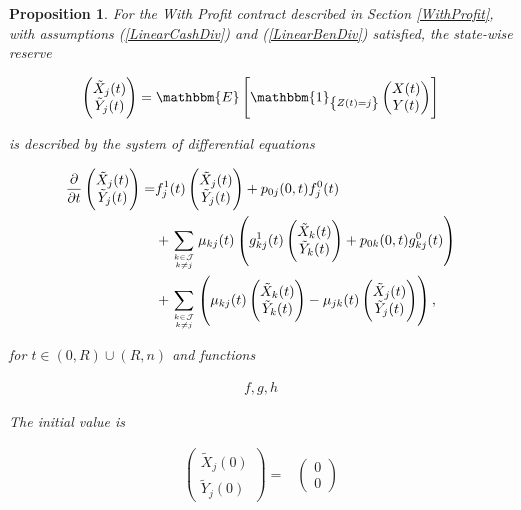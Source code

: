 \documentclass{article}
\newcommand{\1}[1]{\mathbbm{1}_{\left\lbrace #1 \right\rbrace}}
\newcommand{\expec}[1][def]{\mathbbm{E} \left[ #1 \right]}
\theoremstyle{break}
\newtheorem{proposition}[definition]{Proposition}%
\theoremstyle{remark}
\numberwithin{equation}{section}
\begin{document}
\begin{proposition} \label{WPMainResult}
For the With Profit contract described in Section \ref{WithProfit}, with assumptions (\ref{LinearCashDiv}) and (\ref{LinearBenDiv}) satisfied, the state-wise reserve

\begin{align*}
\begin{pmatrix}\tilde{X}_j(t) \\ \tilde{Y}_j(t)\end{pmatrix} = \expec[\1{Z(t)=j}\begin{pmatrix}X(t) \\ Y(t)\end{pmatrix}]
\end{align*}

is described by the system of differential equations

\begin{align*}
\frac{\partial}{\partial t} \begin{pmatrix}\tilde{X}_j(t) \\ \tilde{Y}_j(t)\end{pmatrix} =& f_j^1(t) \begin{pmatrix}\tilde{X}_j(t) \\ \tilde{Y}_j(t)\end{pmatrix} + p_{0j}(0,t) f_j^0(t) \\
&+ \sum_{k \in \mathcal{J} \atop k \neq j} \mu_{kj}(t) \left( g_{kj}^1(t) \begin{pmatrix}\tilde{X}_k(t) \\ \tilde{Y}_k(t)\end{pmatrix} + p_{0k}(0,t) g_{kj}^0(t) \right) \\
&+ \sum_{k \in \mathcal{J} \atop k \neq j} \left( \mu_{kj}(t) \begin{pmatrix}\tilde{X}_k(t) \\ \tilde{Y}_k(t)\end{pmatrix} - \mu_{jk}(t) \begin{pmatrix}\tilde{X}_j(t) \\ \tilde{Y}_j(t)\end{pmatrix} \right),
\end{align*}

for $t \in (0,R)\cup(R,n)$ and functions

\begin{align*}
	f,g,h
\end{align*}


The initial value is

\begin{align*}
\begin{pmatrix}\tilde{X}_j(0) \\ \tilde{Y}_j(0)\end{pmatrix} =& \begin{pmatrix}0 \\ 0\end{pmatrix}
\end{align*}


\end{proposition}
\end{document}
